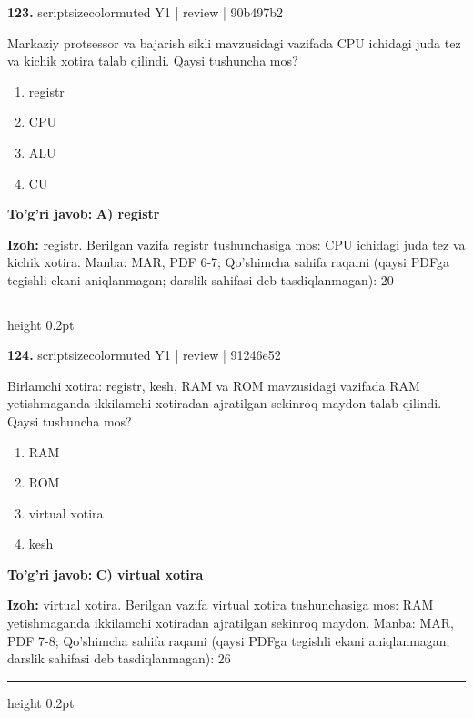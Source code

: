 \documentclass[10pt,a4paper]{article}
\begin{document}
{\bfseries\sffamily\color{ink} 123.} {scriptsizecolor{muted} Y1 | review | 90b497b2}
\par
Markaziy protsessor va bajarish sikli mavzusidagi vazifada CPU ichidagi juda tez va kichik xotira talab qilindi. Qaysi tushuncha mos?
\begin{enumerate}[label=\Alph*),leftmargin=9mm]
\item registr
\item CPU
\item ALU
\item CU
\end{enumerate}
\begin{tcolorbox}[enhanced,breakable,colback=teal!4,colframe=teal!60!black,boxrule=0.45pt,arc=1.2mm,left=2.7mm,right=2.7mm,top=1.8mm,bottom=1.8mm,before skip=2mm,after skip=2mm]
{\bfseries\sffamily\color{teal}To'g'ri javob:} \textbf{A) registr}
\par\smallskip
{\bfseries Izoh:} registr. Berilgan vazifa registr tushunchasiga mos: CPU ichidagi juda tez va kichik xotira. Manba: MAR, PDF 6-7; Qo'shimcha sahifa raqami (qaysi PDFga tegishli ekani aniqlanmagan; darslik sahifasi deb tasdiqlanmagan): 20
\end{tcolorbox}
\vspace{2mm}\hrule height 0.2pt\vspace{3mm}

{\bfseries\sffamily\color{ink} 124.} {scriptsizecolor{muted} Y1 | review | 91246e52}
\par
Birlamchi xotira: registr, kesh, RAM va ROM mavzusidagi vazifada RAM yetishmaganda ikkilamchi xotiradan ajratilgan sekinroq maydon talab qilindi. Qaysi tushuncha mos?
\begin{enumerate}[label=\Alph*),leftmargin=9mm]
\item RAM
\item ROM
\item virtual xotira
\item kesh
\end{enumerate}
\begin{tcolorbox}[enhanced,breakable,colback=teal!4,colframe=teal!60!black,boxrule=0.45pt,arc=1.2mm,left=2.7mm,right=2.7mm,top=1.8mm,bottom=1.8mm,before skip=2mm,after skip=2mm]
{\bfseries\sffamily\color{teal}To'g'ri javob:} \textbf{C) virtual xotira}
\par\smallskip
{\bfseries Izoh:} virtual xotira. Berilgan vazifa virtual xotira tushunchasiga mos: RAM yetishmaganda ikkilamchi xotiradan ajratilgan sekinroq maydon. Manba: MAR, PDF 7-8; Qo'shimcha sahifa raqami (qaysi PDFga tegishli ekani aniqlanmagan; darslik sahifasi deb tasdiqlanmagan): 26
\end{tcolorbox}
\vspace{2mm}\hrule height 0.2pt\vspace{3mm}
\end{document}
